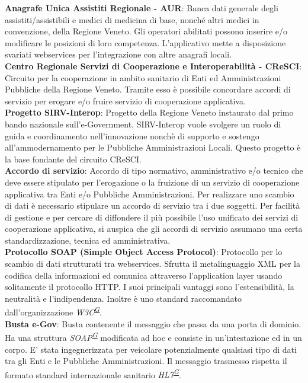 \documentclass[a4paper]{article}
\begin{document}
\noindent
\textbf{Anagrafe Unica Assistiti Regionale - AUR}: Banca dati generale degli assistiti/assistibili e medici di medicina di base, nonché altri medici in convenzione, della Regione Veneto. Gli operatori abilitati possono inserire e/o modificare le posizioni di loro competenza. L'applicativo mette a disposizione svariati webservices per l'integrazione con altre anagrafi locali.
\\

\noindent
\textbf{Centro Regionale Servizi di Cooperazione e Interoperabilità - CReSCI}: Circuito per la cooperazione in ambito sanitario di Enti ed Amministrazioni Pubbliche della Regione Veneto. Tramite esso è possibile concordare accordi di servizio per erogare e/o fruire servizio di cooperazione applicativa.
\\

\noindent
\textbf{Progetto SIRV-Interop}: Progetto della Regione Veneto instaurato dal primo bando nazionale sull'e-Government. SIRV-Interop vuole svolgere un ruolo di guida e coordinamento nell'innovazione nonchè di supporto e sostengo all'ammodernamento per le Pubbliche Amministrazioni Locali. Questo progetto è la base fondante del circuito CReSCI.
\\

\noindent
\textbf{Accordo di servizio}: Accordo di tipo normativo, amministrativo e/o tecnico che deve essere stipulato per l'erogazione o la fruizione di un servizio di cooperazione applicativa tra Enti e/o Pubbliche Amministrazioni. Per realizzare uno scambio di dati è necessario stipulare un accordo di servizio tra i due soggetti. Per facilità di gestione e per cercare di diffondere il più possibile l'uso unificato dei servizi di cooperazione applicativa, si auspica che gli accordi di servizio assumano una certa standardizzazione, tecnica ed amministrativa.
\\

\noindent
\textbf{Protocollo SOAP (Simple Object Access Protocol)}: Protocollo per lo scambio di dati strutturati tra webservices. Sfrutta il metalinguaggio XML per la codifica della informazioni ed comunica attraverso l'application layer usando solitamente il protocollo HTTP. I suoi principali vantaggi sono l'estensibilità, la neutralità e l'indipendenza. Inoltre è uno standard raccomandato dall'organizzazione \textit{W3C\textsuperscript{\hyperref[sec:gl]{G}}}.
\\

\noindent
\textbf{Busta e-Gov}: Busta contenente il messaggio che passa da una porta di dominio. Ha una struttura \textit{SOAP\textsuperscript{\hyperref[sec:gl]{G}}} modificata ad hoc e consiste in un'intestazione ed in un corpo. E' stata ingegnerizzata per veicolare potenzialmente qualsiasi tipo di dati tra gli Enti e le Pubbliche Amministrazioni. Il messaggio trasmesso rispetta il formato standard internazionale sanitario \textit{HL7\textsuperscript{\hyperref[sec:gl]{G}}}.
\\
\end{document}
